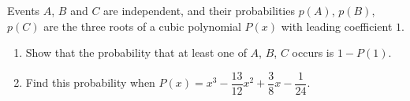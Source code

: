 Events $A$, $B$ and $C$ are independent, and their probabilities $p(A)$, $p(B)$, $p(C)$ are the three roots of a cubic polynomial $P(x)$ with leading coefficient $1$.
\begin{enumerate}
\item[(a)] Show that the probability that at least one of $A$, $B$, $C$ occurs is $1-P(1)$.
\item[(b)] Find this probability when $P(x)=x^3-\dfrac{13}{12}x^2+\dfrac38x-\dfrac1{24}$.
\end{enumerate}
